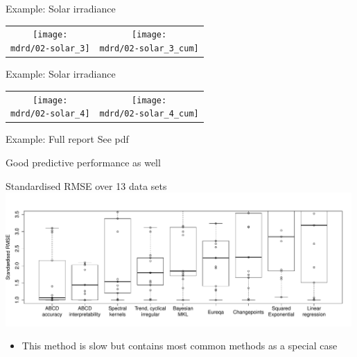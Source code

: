 \begin{frame}{Example: Solar irradiance}
\newcommand{\wmgd}{0.5\columnwidth}
\newcommand{\hmgd}{3.0cm}
\newcommand{\mdrd}{../figures/02-solar}
\newcommand{\mbm}{\hspace{-0.3cm}}
{\footnotesize

}

\vspace{\baselineskip}

\begin{tabular}{cc}
\mbm \texttt{[image: \\mdrd/02-solar\_3]} & \texttt{[image: \\mdrd/02-solar\_3\_cum]}
\end{tabular}
\end{frame}

\begin{frame}{Example: Solar irradiance}
\newcommand{\wmgd}{0.5\columnwidth}
\newcommand{\hmgd}{3.0cm}
\newcommand{\mdrd}{../figures/02-solar}
\newcommand{\mbm}{\hspace{-0.3cm}}
{\footnotesize

}

\vspace{\baselineskip}

\begin{tabular}{cc}
\mbm \texttt{[image: \\mdrd/02-solar\_4]} & \texttt{[image: \\mdrd/02-solar\_4\_cum]}
\end{tabular}
\end{frame}

\begin{frame}{Example: Full report}
  See pdf
\end{frame}

\begin{frame}{Good predictive performance as well}
  \begin{block}{Standardised RMSE over 13 data sets}
  \includegraphics[width=0.99\textwidth]{../figures/box_extrap_wide}\\
  \begin{itemize}
    \item This method is slow but contains most common methods as a special case
  \end{itemize}
  \end{block}
\end{frame}


